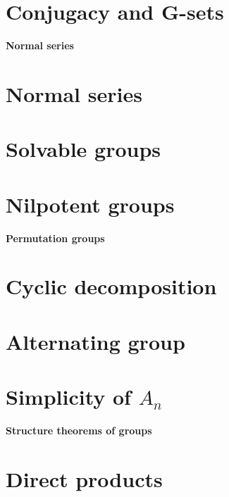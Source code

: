\documentclass[twocolumn]{article}
\begin{document}
\section{Conjugacy and G-sets}

\textbf{\Huge Normal series}
\section{Normal series}

\section{Solvable groups}

\section{Nilpotent groups}


\textbf{\huge Permutation groups}
\section{Cyclic decomposition}

\section{Alternating group}

\section{Simplicity of $A_n$}

\textbf{\huge Structure theorems of groups}
\section{Direct products}
\end{document}
